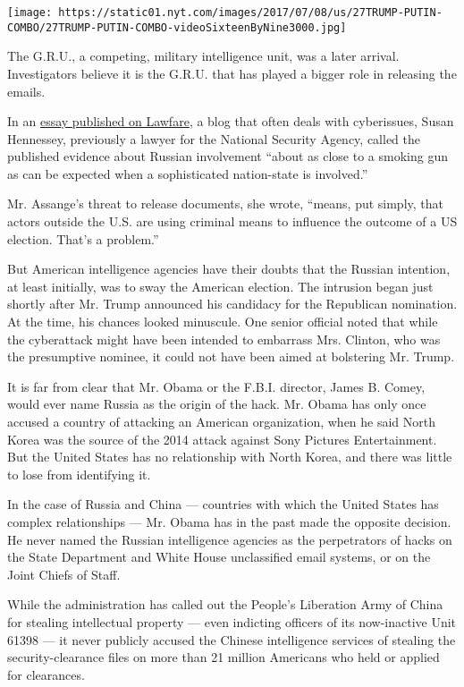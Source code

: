 \texttt{[image: https://static01.nyt.com/images/2017/07/08/us/27TRUMP-PUTIN-COMBO/27TRUMP-PUTIN-COMBO-videoSixteenByNine3000.jpg]}

The G.R.U., a competing, military intelligence unit, was a later
arrival. Investigators believe it is the G.R.U. that has played a bigger
role in releasing the emails.

In an
\href{https://www.lawfareblog.com/what-does-us-government-know-about-russia-and-dnc-hack}{essay
published on Lawfare}, a blog that often deals with cyberissues, Susan
Hennessey, previously a lawyer for the National Security Agency, called
the published evidence about Russian involvement ``about as close to a
smoking gun as can be expected when a sophisticated nation-state is
involved.''

Mr. Assange's threat to release documents, she wrote, ``means, put
simply, that actors outside the U.S. are using criminal means to
influence the outcome of a US election. That's a problem.''

But American intelligence agencies have their doubts that the Russian
intention, at least initially, was to sway the American election. The
intrusion began just shortly after Mr. Trump announced his candidacy for
the Republican nomination. At the time, his chances looked minuscule.
One senior official noted that while the cyberattack might have been
intended to embarrass Mrs. Clinton, who was the presumptive nominee, it
could not have been aimed at bolstering Mr. Trump.

It is far from clear that Mr. Obama or the F.B.I. director, James B.
Comey, would ever name Russia as the origin of the hack. Mr. Obama has
only once accused a country of attacking an American organization, when
he said North Korea was the source of the 2014 attack against Sony
Pictures Entertainment. But the United States has no relationship with
North Korea, and there was little to lose from identifying it.

In the case of Russia and China --- countries with which the United
States has complex relationships --- Mr. Obama has in the past made the
opposite decision. He never named the Russian intelligence agencies as
the perpetrators of hacks on the State Department and White House
unclassified email systems, or on the Joint Chiefs of Staff.

While the administration has called out the People's Liberation Army of
China for stealing intellectual property --- even indicting officers of
its now-inactive Unit 61398 --- it never publicly accused the Chinese
intelligence services of stealing the security-clearance files on more
than 21 million Americans who held or applied for clearances.

